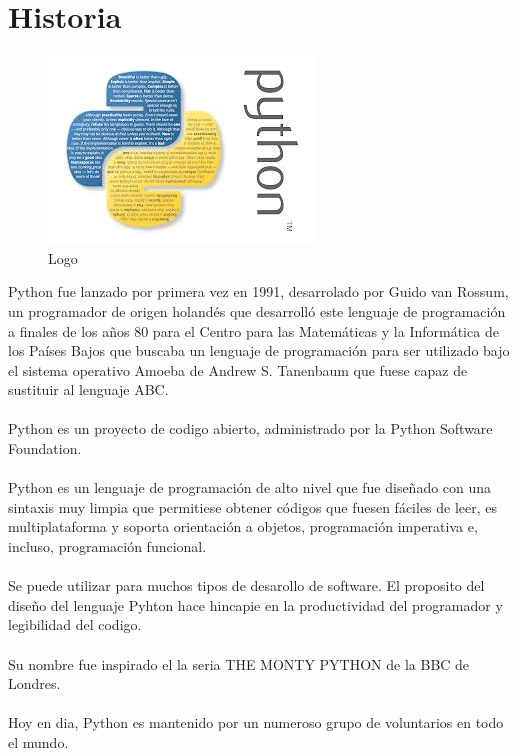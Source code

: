 \documentclass[11pt]{article} %
\begin{document}
\section{Historia}
\begin{figure}[htbp]
	\begin{center}
		\includegraphics[width=.60\textwidth]{./imagenes/python.png}
		\caption{Logo}
		\label{Logo}
	\end{center}
\end{figure}

Python fue lanzado por primera vez en 1991, desarrolado por Guido van Rossum, un programador de origen holandés que desarrolló este lenguaje de programación a finales de los años 80 para el Centro para las Matemáticas y la Informática de los Países Bajos que buscaba un lenguaje de programación para ser utilizado bajo el sistema operativo Amoeba de Andrew S. Tanenbaum que fuese capaz de sustituir al lenguaje ABC.
\\\\
Python es un proyecto de codigo abierto, administrado por la Python Software Foundation.
\\\\
Python es un lenguaje de programación de alto nivel que fue diseñado con una sintaxis muy limpia que permitiese obtener códigos que fuesen fáciles de leer, es multiplataforma y soporta orientación a objetos, programación imperativa e, incluso, programación funcional.
\\\\
Se puede utilizar para muchos tipos de desarollo de software. El proposito del diseño del lenguaje Pyhton hace hincapie en  la productividad del programador y legibilidad del codigo.
\\\\
Su nombre fue inspirado el la seria THE MONTY PYTHON de la BBC de Londres.
\\\\
Hoy en dia, Python es mantenido por un numeroso grupo de voluntarios en todo el mundo.
\end{document}

